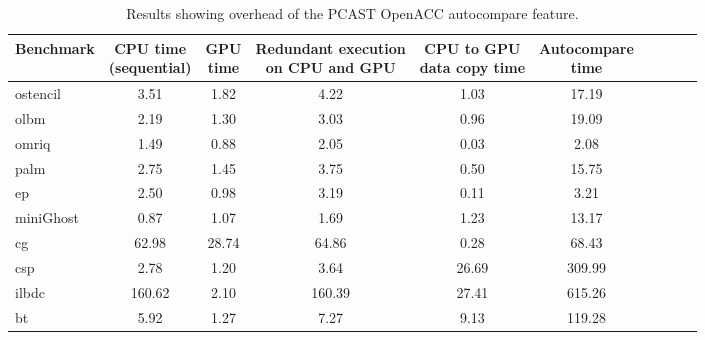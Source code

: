 \begin{table}
\begin{center}
\begin{tabular}{|l|c|c|c|c|c|c|c|c|c|}
\hline

Benchmark & \parbox[c]{1.9 cm}{\centering CPU time \\(sequential)} &  \parbox[c]{1 cm}{\centering GPU \\ time} & \parbox[c]{3.5 cm}{\centering Redundant execution \\ on CPU and GPU} & \parbox[c]{2.75 cm}{\centering CPU to GPU \\  data copy time} &  \parbox[c]{2 cm}{\centering Autocompare \\   time} \\



\hline

ostencil  & 3.51 & 1.82 & 4.22 & 1.03 & 17.19\\
olbm      & 2.19 & 1.30 & 3.03 & 0.96 & 19.09 \\
omriq     & 1.49 & 0.88 & 2.05 & 0.03 & 2.08\\
palm      & 2.75 & 1.45 & 3.75 & 0.50 & 15.75\\
ep        & 2.50 & 0.98 & 3.19 & 0.11 & 3.21\\
miniGhost & 0.87 & 1.07 & 1.69 & 1.23 & 13.17\\
cg        & 62.98 & 28.74 & 64.86 & 0.28 & 68.43\\
csp       & 2.78 & 1.20	& 3.64 & 26.69 & 309.99\\
ilbdc     & 160.62 & 2.10 & 160.39 & 27.41 & 615.26\\
bt        & 5.92 & 1.27 & 7.27 & 9.13 & 119.28\\

            
\hline
\end{tabular}
\end{center}
\caption{Results showing overhead of the PCAST OpenACC autocompare feature.}
\label{res1}
\end{table}






